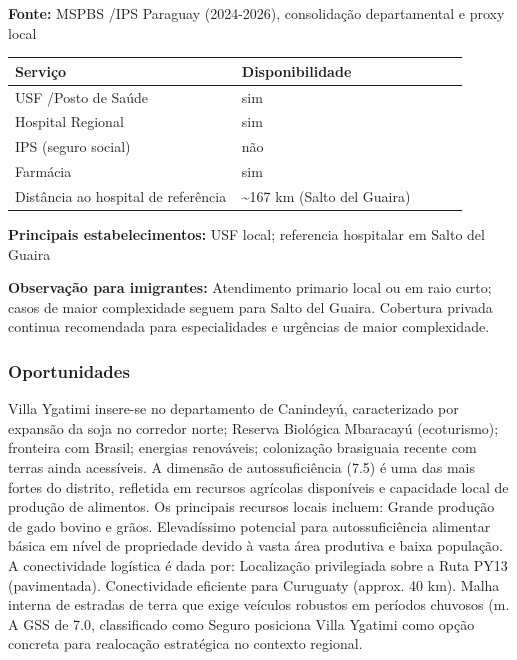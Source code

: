 \textbf{Fonte:} MSPBS /\allowbreak  IPS Paraguay (2024-2026), consolidação
departamental e proxy local

{\def\LTcaptype{none} %
\begin{longtable}{@{}>{\raggedright\arraybackslash}p{0.45\linewidth} >{\raggedright\arraybackslash}p{0.45\linewidth}@{}}
\toprule\noalign{}
Serviço & Disponibilidade \\
\midrule\noalign{}
\endhead
\bottomrule\noalign{}
\endlastfoot
USF /\allowbreak  Posto de Saúde & sim \\
Hospital Regional & sim \\
IPS (seguro social) & não \\
Farmácia & sim \\
Distância ao hospital de referência & \textasciitilde167 km (Salto del
Guaira) \\
\end{longtable}
}

\textbf{Principais estabelecimentos:} USF local; referencia hospitalar
em Salto del Guaira

\textbf{Observação para imigrantes:} Atendimento primario local ou em
raio curto; casos de maior complexidade seguem para Salto del Guaira.
Cobertura privada continua recomendada para especialidades e urgências
de maior complexidade.
\newpage

\subsubsection*{Oportunidades}\label{oport-villa-ygatimi-1404}
Villa Ygatimi insere-se no departamento de Canindeyú, caracterizado por expansão da soja no corredor norte; Reserva Biológica Mbaracayú (ecoturismo); fronteira com Brasil; energias renováveis; colonização brasiguaia recente com terras ainda acessíveis. A dimensão de autossuficiência (7.5) é uma das mais fortes do distrito, refletida em recursos agrícolas disponíveis e capacidade local de produção de alimentos. Os principais recursos locais incluem: Grande produção de gado bovino e grãos. Elevadíssimo potencial para autossuficiência alimentar básica em nível de propriedade devido à vasta área produtiva e baixa população. A conectividade logística é dada por: Localização privilegiada sobre a Ruta PY13 (pavimentada). Conectividade eficiente para Curuguaty (approx. 40 km). Malha interna de estradas de terra que exige veículos robustos em períodos chuvosos (m. A GSS de 7.0, classificado como Seguro posiciona Villa Ygatimi como opção concreta para realocação estratégica no contexto regional.

